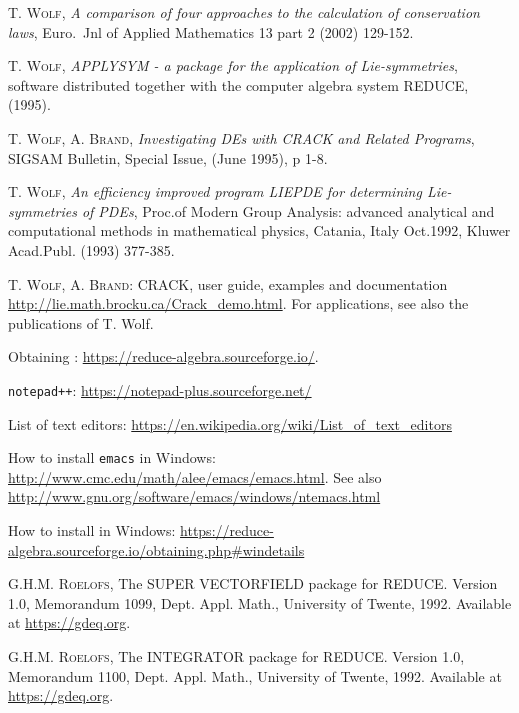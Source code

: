 \begin{thebibliography}{999}
 \textsc{T. Wolf}, \emph{A comparison of four approaches to the
    calculation of conservation laws}, Euro.\ Jnl of Applied Mathematics 13
  part 2 (2002) 129-152.

 \textsc{T. Wolf}, \emph{APPLYSYM - a package for the
    application of Lie-symmetries}, software distributed together with the
  computer algebra system REDUCE, (1995).

 \textsc{T. Wolf, A. Brand}, \emph{Investigating DEs with CRACK
    and Related Programs}, SIGSAM Bulletin, Special Issue, (June 1995), p 1-8.

 \textsc{T. Wolf}, \emph{An efficiency improved program LIEPDE
    for determining Lie-symmetries of PDEs}, Proc.of Modern Group Analysis:
  advanced analytical and computational methods in mathematical physics,
  Catania, Italy Oct.1992, Kluwer Acad.Publ. (1993) 377-385.

 \textsc{T. Wolf, A. Brand}: CRACK, user guide, examples and
    documentation \url{http://lie.math.brocku.ca/Crack_demo.html}. For
    applications, see also the publications of T. Wolf.


 Obtaining \REDUCE: \url{https://reduce-algebra.sourceforge.io/}.


 \texttt{notepad++}:
    \url{https://notepad-plus.sourceforge.net/}

 List of text editors:
    \url{https://en.wikipedia.org/wiki/List_of_text_editors}

 How to install \texttt{emacs} in Windows:
    \url{http://www.cmc.edu/math/alee/emacs/emacs.html}. See also
    \url{http://www.gnu.org/software/emacs/windows/ntemacs.html}

 How to install \REDUCE in Windows:
    \url{https://reduce-algebra.sourceforge.io/obtaining.php#windetails}

 \textsc{G.H.M. Roelofs}, The SUPER VECTORFIELD package for
    REDUCE. Version 1.0, Memorandum 1099, Dept. Appl. Math., University of
    Twente, 1992. Available at \url{https://gdeq.org}.

 \textsc{G.H.M. Roelofs}, The INTEGRATOR package for
    REDUCE. Version 1.0, Memorandum 1100, Dept. Appl. Math., University of
    Twente, 1992. Available at \url{https://gdeq.org}.


\end{thebibliography}

